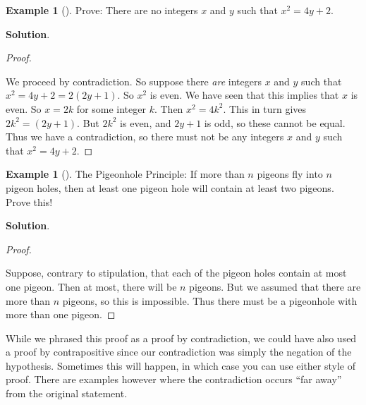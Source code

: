 \documentclass[10pt,]{book}
\theoremstyle{plain}
\theoremstyle{definition}
\theoremstyle{definition}
\newtheorem{example}[theorem]{Example}
\theoremstyle{definition}
\theoremstyle{definition}
\numberwithin{equation}{chapter}
\begin{document}
\begin{example}[]\label{example-70}
\hypertarget{p-1974}{}%
Prove: There are no integers \(x\) and \(y\) such that \(x^2  = 4y + 2\).%
\par\smallskip%
\noindent\textbf{Solution}.\hypertarget{solution-185}{}\quad%
\begin{proof}\hypertarget{proof-27}{}
\hypertarget{p-1975}{}%
We proceed by contradiction. So suppose there \emph{are} integers \(x\) and \(y\) such that \(x^2 = 4y + 2 = 2(2y + 1)\). So \(x^2\) is even. We have seen that this implies that \(x\) is even. So \(x = 2k\) for some integer \(k\). Then \(x^2 = 4k^2\). This in turn gives \(2k^2 = (2y + 1)\). But \(2k^2\) is even, and \(2y + 1\) is odd, so these cannot be equal. Thus we have a contradiction, so there must not be any integers \(x\) and \(y\) such that \(x^2 = 4y + 2\).%
\end{proof}
\end{example}
\begin{example}[]\label{example-71}
\hypertarget{p-1976}{}%
The Pigeonhole Principle: If more than \(n\) pigeons fly into \(n\) pigeon holes, then at least one pigeon hole will contain at least two pigeons. Prove this!%
\par\smallskip%
\noindent\textbf{Solution}.\hypertarget{solution-186}{}\quad%
\begin{proof}\hypertarget{proof-28}{}
\hypertarget{p-1977}{}%
Suppose, contrary to stipulation, that each of the pigeon holes contain at most one pigeon. Then at most, there will be \(n\) pigeons. But we assumed that there are more than \(n\) pigeons, so this is impossible. Thus there must be a pigeonhole with more than one pigeon.%
\end{proof}
\hypertarget{p-1978}{}%
While we phrased this proof as a proof by contradiction, we could have also used a proof by contrapositive since our contradiction was simply the negation of the hypothesis. Sometimes this will happen, in which case you can use either style of proof. There are examples however where the contradiction occurs ``far away'' from the original statement.%
\end{example}
\typeout{************************************************}
\typeout{************************************************}
\end{document}
